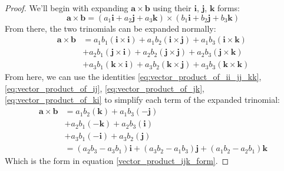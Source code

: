         \begin{proof}
            We'll begin with expanding $\mathbf{a}\times\mathbf{b}$ using their $\mathbf{i}$, $\mathbf{j}$, $\mathbf{k}$ forms:
            \begin{equation}
                \mathbf{a}\times\mathbf{b}=(a_1\mathbf{i}+a_2\mathbf{j}+a_3\mathbf{k})\times(b_1\mathbf{i}+b_2\mathbf{j}+b_3\mathbf{k})
            \end{equation}
            From there, the two trinomials can be expanded normally:
            \begin{equation}
            \begin{aligned}
                \mathbf{a}\times\mathbf{b}
                &=a_1b_1(\mathbf{i}\times\mathbf{i})+a_1b_2(\mathbf{i}\times\mathbf{j})+a_1b_3(\mathbf{i}\times\mathbf{k}) \\
                &+a_2b_1(\mathbf{j}\times\mathbf{i})+a_2b_2(\mathbf{j}\times\mathbf{j})+a_2b_3(\mathbf{j}\times\mathbf{k}) \\
                &+a_3b_1(\mathbf{k}\times\mathbf{i})+a_3b_2(\mathbf{k}\times\mathbf{j})+a_3b_3(\mathbf{k}\times\mathbf{k})
            \end{aligned}
            \end{equation}
            From here, we can use the identities \ref{eq:vector_product_of_ii_jj_kk}, \ref{eq:vector_product_of_ij}, \ref{eq:vector_product_of_jk}, \ref{eq:vector_product_of_ki} to simplify each term of the expanded trinomial:
            \begin{equation}
            \begin{aligned}
                \mathbf{a}\times\mathbf{b}
                &=a_1b_2(\mathbf{k})+a_1b_3(-\mathbf{j}) \\
                &+a_2b_1(-\mathbf{k})+a_2b_3(\mathbf{i}) \\
                &+a_3b_1(\mathbf{-i})+a_3b_2(\mathbf{j}) \\
                &=(a_2b_3-a_3b_1)\mathbf{i}+(a_3b_2-a_1b_3)\mathbf{j}+(a_1b_2-a_2b_1)\mathbf{k}
            \end{aligned}
            \end{equation}
            Which is the form in equation \ref{vector_product_ijk_form}.
        \end{proof}


